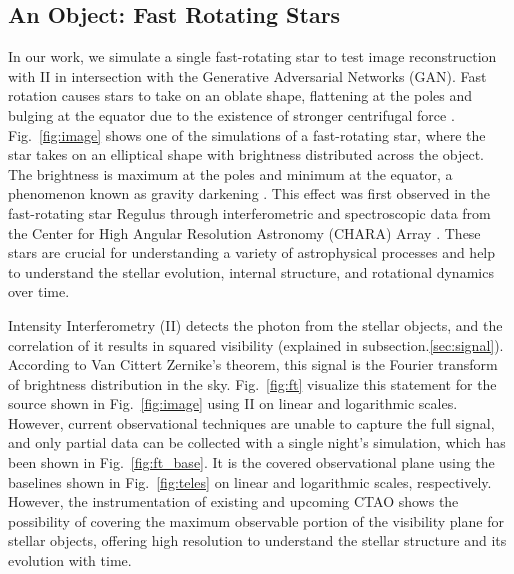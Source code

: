 \subsection{An Object: Fast Rotating Stars}
In our work, we simulate a single fast-rotating star to test image reconstruction with II in intersection with the Generative Adversarial Networks (GAN). Fast rotation causes stars to take on an oblate shape, flattening at the poles and bulging at the equator due to the existence of stronger centrifugal force \citep{von1924radiative, 1999A&A...347..185M}. Fig.~\ref{fig:image} shows one of the simulations of a fast-rotating star, where the star takes on an elliptical shape with brightness distributed across the object. The brightness is maximum at the poles and minimum at the equator, a phenomenon known as gravity darkening \citep{lucy1967gravity}. This effect was first observed in the fast-rotating star Regulus through interferometric and spectroscopic data from the Center for High Angular Resolution Astronomy (CHARA) Array \citep{mcalister2005first}. These stars are crucial for understanding a variety of astrophysical processes and help to understand the stellar evolution, internal structure, and rotational dynamics over time.

Intensity Interferometry (II) detects the photon from the stellar objects, and the correlation of it results in squared visibility (explained in subsection.\ref{sec:signal}). According to Van Cittert Zernike's theorem, this signal is the Fourier transform of brightness distribution in the sky. Fig.~\ref {fig:ft} visualize this statement for the source shown in Fig.~\ref{fig:image} using II on linear and logarithmic scales. However, current observational techniques are unable to capture the full signal, and only partial data can be collected with a single night's simulation, which has been shown in Fig.~\ref{fig:ft_base}. It is the covered observational plane using the baselines shown in Fig.~\ref{fig:teles} on linear and logarithmic scales, respectively. However, the instrumentation of existing and upcoming CTAO shows the possibility of covering the maximum observable portion of the visibility plane for stellar objects, offering high resolution to understand the stellar structure and its evolution with time.